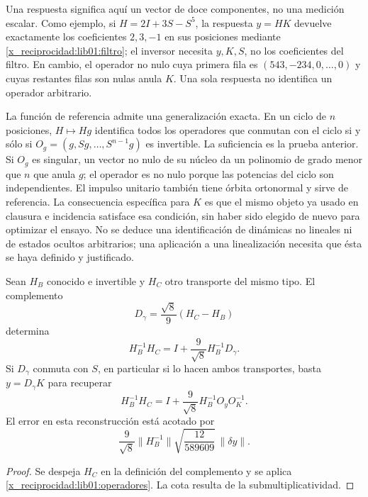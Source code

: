 Una respuesta significa aquí un vector de doce componentes, no una
medición escalar. Como ejemplo, si \(H=2I+3S-S^5\), la respuesta
\(y=HK\) devuelve exactamente los coeficientes \(2,3,-1\) en sus
posiciones mediante \eqref{x_reciprocidad:lib01:filtro}; el inversor necesita \(y,K,S\),
no los coeficientes del filtro. En cambio, el operador no nulo cuya primera
fila es \((543,-234,0,\ldots,0)\) y cuyas restantes filas son nulas
anula \(K\). Una sola respuesta no identifica un operador arbitrario.

La función de referencia admite una generalización exacta. En un ciclo de
\(n\) posiciones, \(H\mapsto Hg\) identifica todos los operadores
que conmutan con el ciclo si y sólo si
\(O_g=(g,Sg,\ldots,S^{n-1}g)\) es invertible. La suficiencia es la
prueba anterior. Si \(O_g\) es singular, un vector no nulo de su núcleo
da un polinomio de grado menor que \(n\) que anula \(g\); el operador
es no nulo porque las potencias del ciclo son independientes. El impulso
unitario también tiene órbita ortonormal y sirve de referencia. La
consecuencia específica para \(K\) es que el mismo objeto ya usado en
clausura e incidencia satisface esa condición, sin haber sido elegido de
nuevo para optimizar el ensayo. No se deduce una identificación de
dinámicas no lineales ni de estados ocultos arbitrarios; una aplicación a
una linealización necesita que ésta se haya definido y justificado.

\begin{corollary}
\label{x_reciprocidad:lib01:holonomia}
Sean \(H_B\) conocido e invertible y \(H_C\) otro transporte del
mismo tipo. El complemento
\[
 D_\gamma=\frac{\sqrt8}{9}(H_C-H_B)
\]
determina
\[
 H_B^{-1}H_C=I+\frac9{\sqrt8}H_B^{-1}D_\gamma.
\]
Si \(D_\gamma\) conmuta con \(S\), en particular si lo hacen ambos
transportes, basta \(y=D_\gamma K\) para recuperar
\begin{equation}
 H_B^{-1}H_C
 =I+\frac9{\sqrt8}H_B^{-1}O_yO_K^{-1}.
 \label{x_reciprocidad:lib01:holonomia-una-respuesta}
\end{equation}
El error en esta reconstrucción está acotado por
\[
 \frac9{\sqrt8}\|H_B^{-1}\|
 \sqrt{\frac{12}{589609}}\,\|\delta y\|.
\]
\end{corollary}
\begin{proof}
Se despeja \(H_C\) en la definición del complemento y se aplica
\cref{x_reciprocidad:lib01:operadores}. La cota resulta de la submultiplicatividad.
\end{proof}

